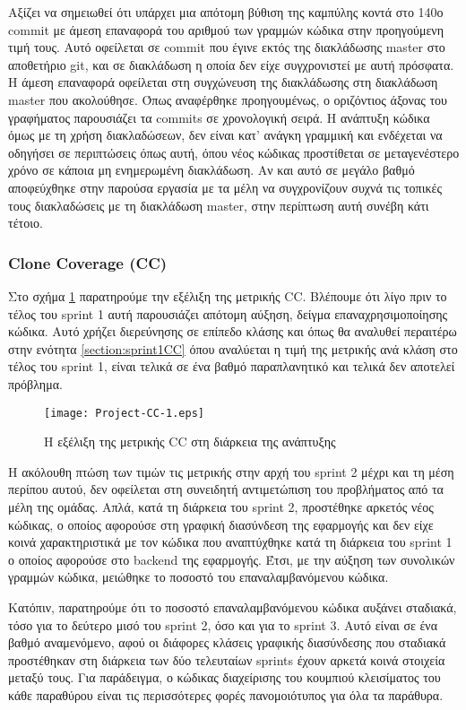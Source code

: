 Αξίζει να σημειωθεί ότι υπάρχει μια απότομη βύθιση της καμπύλης
κοντά στο 140ο commit με άμεση επαναφορά του αριθμού των γραμμών
κώδικα στην προηγούμενη τιμή τους. Αυτό οφείλεται σε commit που
έγινε εκτός της διακλάδωσης master στο αποθετήριο git, και σε
διακλάδωση η οποία δεν είχε συγχρονιστεί με αυτή πρόσφατα. Η
άμεση επαναφορά οφείλεται στη συγχώνευση της διακλάδωσης στη
διακλάδωση master που ακολούθησε. Όπως αναφέρθηκε προηγουμένως, ο
οριζόντιος άξονας του γραφήματος παρουσιάζει τα commits σε
χρονολογική σειρά. Η ανάπτυξη κώδικα όμως με τη χρήση
διακλαδώσεων, δεν είναι κατ’ ανάγκη γραμμική και ενδέχεται να
οδηγήσει σε περιπτώσεις όπως αυτή, όπου νέος κώδικας προστίθεται
σε μεταγενέστερο χρόνο σε κάποια μη ενημερωμένη διακλάδωση. Αν
και αυτό σε μεγάλο βαθμό αποφεύχθηκε στην παρούσα εργασία με τα
μέλη να συγχρονίζουν συχνά τις τοπικές τους διακλαδώσεις με τη
διακλάδωση master, στην περίπτωση αυτή συνέβη κάτι τέτοιο.

\subsubsection{Clone Coverage (CC)}

Στο σχήμα \ref{fig:projectCC} παρατηρούμε την εξέλιξη της μετρικής CC.
Βλέπουμε ότι λίγο πριν το τέλος του sprint 1 αυτή παρουσιάζει απότομη
αύξηση, δείγμα επαναχρησιμοποίησης κώδικα. Αυτό χρήζει διερεύνησης σε
επίπεδο κλάσης και όπως θα αναλυθεί περαιτέρω στην ενότητα
\ref{section:sprint1CC} όπου αναλύεται η τιμή της μετρικής
ανά κλάση στο τέλος του sprint 1, είναι τελικά σε ένα βαθμό
παραπλανητικό και τελικά δεν αποτελεί πρόβλημα.

\begin{figure}
\centering
\texttt{[image: Project-CC-1.eps]}
\caption{Η εξέλιξη της μετρικής CC στη διάρκεια της ανάπτυξης}
\label{fig:projectCC}
\end{figure}

Η ακόλουθη πτώση των τιμών τις μετρικής στην αρχή του sprint 2 μέχρι
και τη μέση περίπου αυτού, δεν οφείλεται στη συνειδητή αντιμετώπιση
του προβλήματος από τα μέλη της ομάδας. Απλά, κατά τη διάρκεια του
sprint 2, προστέθηκε αρκετός νέος κώδικας, ο οποίος αφορούσε στη
γραφική διασύνδεση της εφαρμογής και δεν είχε κοινά χαρακτηριστικά
με τον κώδικα που αναπτύχθηκε κατά τη διάρκεια του sprint 1 ο οποίος
αφορούσε στο backend της εφαρμογής. Έτσι, με την αύξηση των
συνολικών γραμμών κώδικα, μειώθηκε το ποσοστό του επαναλαμβανόμενου
κώδικα.

Κατόπιν, παρατηρούμε ότι το ποσοστό επαναλαμβανόμενου κώδικα αυξάνει
σταδιακά, τόσο για το δεύτερο μισό του sprint 2, όσο και για το
sprint 3. Αυτό είναι σε ένα βαθμό αναμενόμενο, αφού οι διάφορες
κλάσεις γραφικής διασύνδεσης που σταδιακά προστέθηκαν στη διάρκεια
των δύο τελευταίων sprints έχουν αρκετά κοινά στοιχεία μεταξύ τους.
Για παράδειγμα, ο κώδικας διαχείρισης του κουμπιού κλεισίματος του
κάθε παραθύρου είναι τις περισσότερες φορές πανομοιότυπος για όλα τα
παράθυρα.

